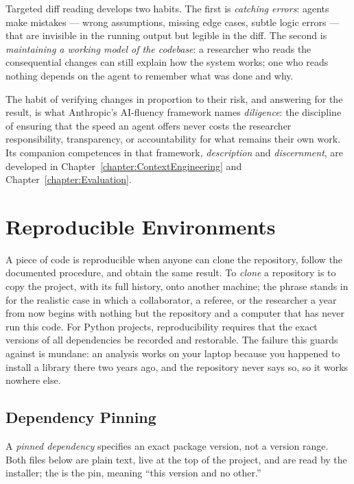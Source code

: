 Targeted diff reading develops two habits.
The first is \emph{catching errors}: agents make mistakes --- wrong assumptions, missing edge cases, subtle logic errors --- that are invisible in the running output but legible in the diff.
The second is \emph{maintaining a working model of the codebase}: a researcher who reads the consequential changes can still explain how the system works; one who reads nothing depends on the agent to remember what was done and why.

\begin{remark}
The habit of verifying changes in proportion to their risk, and answering for the result, is what Anthropic's AI-fluency framework names \emph{diligence}: the discipline of ensuring that the speed an agent offers never costs the researcher responsibility, transparency, or accountability for what remains their own work.
Its companion competences in that framework, \emph{description} and \emph{discernment}, are developed in Chapter~\ref{chapter:ContextEngineering} and Chapter~\ref{chapter:Evaluation}.
\end{remark}

\section{Reproducible Environments}
\label{section:ReproducibleEnvironments}

A piece of code is reproducible when anyone can clone the repository, follow the documented procedure, and obtain the same result.
To \emph{clone} a repository is to copy the project, with its full history, onto another machine; the phrase stands in for the realistic case in which a collaborator, a referee, or the researcher a year from now begins with nothing but the repository and a computer that has never run this code.
For Python projects, reproducibility requires that the exact versions of all dependencies be recorded and restorable.
The failure this guards against is mundane: an analysis works on your laptop because you happened to install a library there two years ago, and the repository never says so, so it works nowhere else.

\subsection{Dependency Pinning}

A \emph{pinned dependency} specifies an exact package version, not a version range.
Both files below are plain text, live at the top of the project, and are read by the installer; the \code{==} is the pin, meaning ``this version and no other.''

